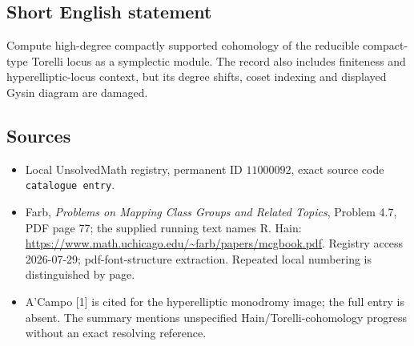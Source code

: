 \documentclass[11pt]{article}
\begin{document}
\subsection{Short English statement}
Compute high-degree compactly supported cohomology of the reducible compact-type Torelli locus as a symplectic module. The record also includes finiteness and hyperelliptic-locus context, but its degree shifts, coset indexing and displayed Gysin diagram are damaged.
\subsection{Sources}
\begin{itemize}
\item Local UnsolvedMath registry, permanent ID \(11000092\), exact source code \texttt{catalogue entry}.
\item Farb, \emph{Problems on Mapping Class Groups and Related Topics}, Problem 4.7, PDF page 77; the supplied running text names R. Hain: \url{https://www.math.uchicago.edu/~farb/papers/mcgbook.pdf}. Registry access 2026-07-29; pdf-font-structure extraction. Repeated local numbering is distinguished by page.
\item A'Campo [1] is cited for the hyperelliptic monodromy image; the full entry is absent. The summary mentions unspecified Hain/Torelli-cohomology progress without an exact resolving reference.
\end{itemize}
\end{document}
